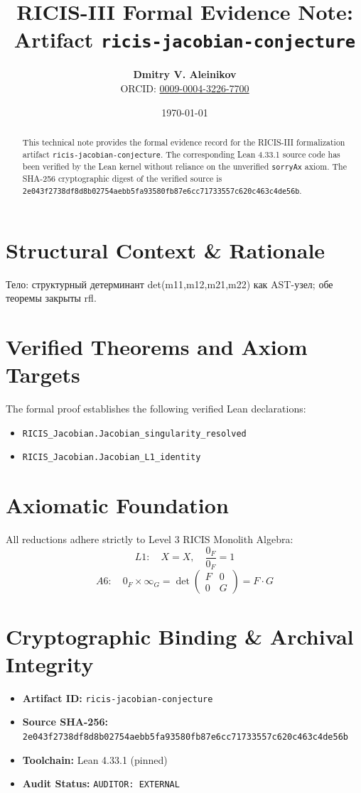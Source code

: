 \documentclass[11pt,a4paper]{article}
\title{\textbf{RICIS-III Formal Evidence Note:\\Artifact \texttt{ricis-jacobian-conjecture}}}
\author{\textbf{Dmitry V. Aleinikov}\\ORCID: \href{https://orcid.org/0009-0004-3226-7700}{0009-0004-3226-7700}}
\date{\today}
\begin{document}
\maketitle

\begin{abstract}
This technical note provides the formal evidence record for the RICIS-III formalization artifact \texttt{ricis-jacobian-conjecture}.
The corresponding Lean 4.33.1 source code has been verified by the Lean kernel without reliance on the unverified \texttt{sorryAx} axiom.
The SHA-256 cryptographic digest of the verified source is \texttt{2e043f2738df8d8b02754aebb5fa93580fb87e6cc71733557c620c463c4de56b}.
\end{abstract}

\section{Structural Context & Rationale}
Тело: структурный детерминант det(m11,m12,m21,m22) как AST-узел; обе теоремы закрыты rfl.

\section{Verified Theorems and Axiom Targets}
The formal proof establishes the following verified Lean declarations:
\begin{itemize}
  \item \texttt{RICIS_Jacobian.Jacobian_singularity_resolved}
  \item \texttt{RICIS_Jacobian.Jacobian_L1_identity}
\end{itemize}

\section{Axiomatic Foundation}
All reductions adhere strictly to Level 3 RICIS Monolith Algebra:
\begin{equation}
L1: \quad X = X, \quad \frac{0_F}{0_F} = 1
\end{equation}
\begin{equation}
A6: \quad 0_F \times \infty_G = \det\begin{pmatrix} F & 0 \\ 0 & G \end{pmatrix} = F \cdot G
\end{equation}

\section{Cryptographic Binding & Archival Integrity}
\begin{itemize}
  \item \textbf{Artifact ID:} \texttt{ricis-jacobian-conjecture}
  \item \textbf{Source SHA-256:} \texttt{2e043f2738df8d8b02754aebb5fa93580fb87e6cc71733557c620c463c4de56b}
  \item \textbf{Toolchain:} Lean 4.33.1 (pinned)
  \item \textbf{Audit Status:} \texttt{AUDITOR: EXTERNAL}
\end{itemize}
\end{document}
